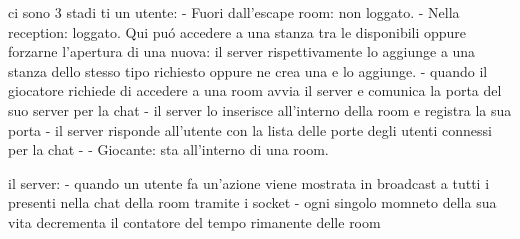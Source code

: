 ci sono 3 stadi ti un utente:
  - Fuori dall'escape room: non loggato.
  - Nella reception: loggato. Qui puó accedere a una stanza tra le disponibili oppure forzarne l'apertura di una nuova: il server rispettivamente 
  lo aggiunge a una stanza dello stesso tipo richiesto oppure ne crea una e lo aggiunge.
      - quando il giocatore richiede di accedere a una room avvia il server e comunica la porta del suo server per la chat
      - il server lo inserisce all'interno della room e registra la sua porta
      - il server risponde all'utente con la lista delle porte degli utenti connessi per la chat 
      - 
  - Giocante: sta all'interno di una room.

il server:
  - quando un utente fa un'azione viene mostrata in broadcast a tutti i presenti nella chat della room tramite
    i socket
  - ogni singolo momneto della sua vita decrementa il contatore del tempo rimanente delle room 
